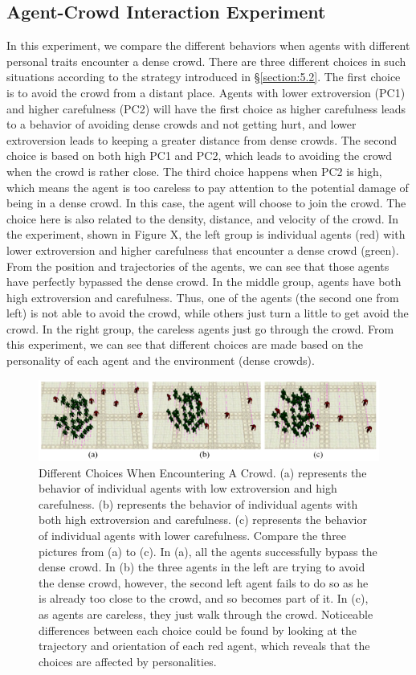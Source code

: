 \documentclass[conference]{acmsiggraph}
\begin{document}
\subsection{Agent-Crowd Interaction Experiment}
\label{section:6.3}
In this experiment, we compare the different behaviors when agents with different personal traits encounter a dense crowd. There are three different choices in such situations according to the strategy introduced in \S\ref{section:5.2}. The first choice is to avoid the crowd from a distant place. Agents with lower extroversion (PC1) and higher carefulness (PC2) will have the first choice as higher carefulness leads to a behavior of avoiding dense crowds and not getting hurt, and lower extroversion leads to keeping a greater distance from dense crowds. The second choice is based on both high PC1 and PC2, which leads to avoiding the crowd when the crowd is rather close. The third choice happens when PC2 is high, which means the agent is too careless to pay attention to the potential damage of being in a dense crowd. In this case, the agent will choose to join the crowd. The choice here is also related to the density, distance, and velocity of the crowd. In the experiment, shown in Figure X, the left group is individual agents (red) with lower extroversion and higher carefulness that encounter a dense crowd (green). From the position and trajectories of the agents, we can see that those agents have perfectly bypassed the dense crowd. In the middle group, agents have both high extroversion and carefulness. Thus, one of the agents (the second one from left) is not able to avoid the crowd, while others just turn a little to get avoid the crowd. In the right group, the careless agents just go through the crowd. From this experiment, we can see that different choices are made based on the personality of each agent and the environment (dense crowds). 


\begin{figure}
  \centering
  \includegraphics[width=6.4in]{images/agent_crowd}
  \caption{Different Choices When Encountering A Crowd. (a) represents the behavior of individual agents with low extroversion and high carefulness. (b) represents the behavior of individual agents with both high extroversion and carefulness. (c) represents the behavior of individual agents with lower carefulness. Compare the three pictures from (a) to (c). In (a), all the agents successfully bypass the dense crowd. In (b) the three agents in the left are trying to avoid the dense crowd, however, the second left agent fails to do so as he is already too close to the crowd, and so becomes part of it. In (c), as agents are careless, they just walk through the crowd. Noticeable differences between each choice could be found by looking at the trajectory and orientation of each red agent, which reveals that the choices are affected by personalities.}
  \label{figure:agentcrowd}
\end{figure}
\end{document}
